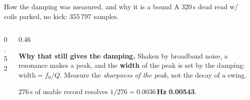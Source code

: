 \documentclass[aspectratio=169]{beamer}
\begin{document}
\begin{frame}{How the damping was measured, and why it is a bound}
  A 320\,s dead read w/ coils parked, no kick: 355\,797 samples.
  \scriptsize
  \begin{columns}[T]
    \begin{column}{0.52\textwidth}
    \end{column}
    \begin{column}{0.46\textwidth}
      \raggedright
      \textbf{Why that still gives the damping.} Shaken by broadband noise, a
      resonance makes a peak, and the \textbf{width} of the peak is set by the
      damping: $\text{width} = f_0 / Q$. Measure the \emph{sharpness of the
      peak}, not the decay of a swing.

      \vspace{1.5mm}
      276\,s of usable record resolves $1/276 = \mathbf{0.0036}$\,\textbf{Hz}
      \textbf{0.00543}.
    \end{column}
  \end{columns}
\end{frame}
\end{document}
